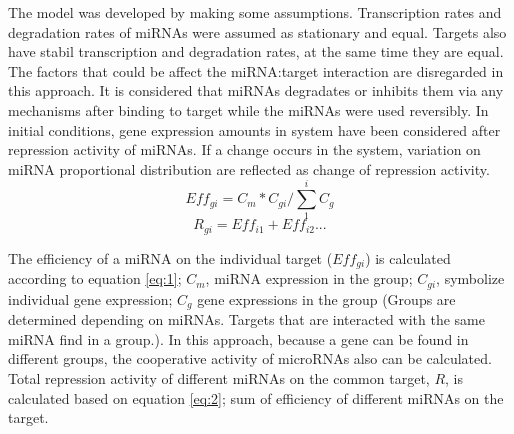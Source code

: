 \documentclass[]{article}
\begin{document}
The model was developed by making some assumptions. Transcription rates
and degradation rates of miRNAs were assumed as stationary and equal.
Targets also have stabil transcription and degradation rates, at the
same time they are equal. The factors that could be affect the
miRNA:target interaction are disregarded in this approach. It is
considered that miRNAs degradates or inhibits them via any mechanisms
after binding to target while the miRNAs were used reversibly. In
initial conditions, gene expression amounts in system have been
considered after repression activity of miRNAs. If a change occurs in
the system, variation on miRNA proportional distribution are reflected
as change of repression activity. \begin{equation} 
    Eff_{gi}= C_m * C_{gi}/\sum_{1}^{i} C_g \tag{1}\label{eq:1}
\end{equation} \begin{equation}
   R_{gi}= Eff_{i1}+ Eff_{i2} ... \tag{2}\label{eq:2}
\end{equation}

The efficiency of a miRNA on the individual target (\(Eff_{gi}\)) is
calculated according to equation \eqref{eq:1}; \(C_m\), miRNA expression
in the group; \(C_{gi}\), symbolize individual gene expression; \(C_g\)
gene expressions in the group (Groups are determined depending on
miRNAs. Targets that are interacted with the same miRNA find in a
group.). In this approach, because a gene can be found in different
groups, the cooperative activity of microRNAs also can be calculated.
Total repression activity of different miRNAs on the common target,
\(R\), is calculated based on equation \eqref{eq:2}; sum of efficiency
of different miRNAs on the target.
\end{document}
